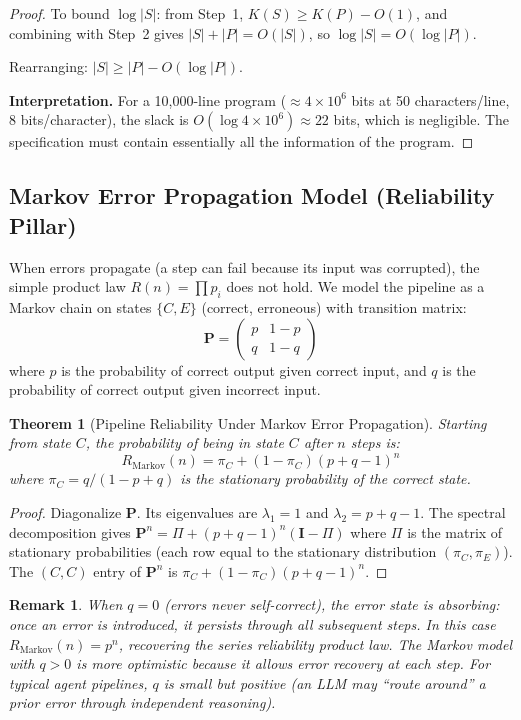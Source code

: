 \documentclass[11pt, a4paper]{googledeepmind}
\newtheorem{theorem}{Theorem}[section]
\newtheorem*{remark}{Remark}
\begin{document}
\begin{appendices}
\begin{proof}
To bound $\log |S|$: from Step~1, $K(S) \geq K(P) - O(1)$, and combining
with Step~2 gives $|S| + |P| = O(|S|)$, so $\log |S| = O(\log |P|)$.

Rearranging: $|S| \geq |P| - O(\log |P|)$.

\textbf{Interpretation.} For a 10,000-line program ($\approx 4 \times 10^6$ bits
at 50 characters/line, 8 bits/character), the slack is
$O(\log 4 \times 10^6) \approx 22$ bits, which is negligible.
The specification must contain essentially all the information of the program.
\end{proof}


\subsection{Markov Error Propagation Model (Reliability Pillar)}

When errors propagate (a step can fail because its input was corrupted),
the simple product law $R(n) = \prod p_i$ does not hold.
We model the pipeline as a Markov chain on states $\{C, E\}$ (correct, erroneous)
with transition matrix:
\[
  \mathbf{P} = \begin{pmatrix} p & 1 - p \\ q & 1 - q \end{pmatrix}
\]
where $p$ is the probability of correct output given correct input,
and $q$ is the probability of correct output given incorrect input.

\begin{theorem}[Pipeline Reliability Under Markov Error Propagation]
Starting from state $C$, the probability of being in state $C$ after $n$ steps is:
\[
  R_{\mathrm{Markov}}(n) = \pi_C + (1 - \pi_C)(p + q - 1)^n
\]
where $\pi_C = q / (1 - p + q)$ is the stationary probability of the correct state.
\end{theorem}

\begin{proof}
Diagonalize $\mathbf{P}$. Its eigenvalues are $\lambda_1 = 1$ and
$\lambda_2 = p + q - 1$. The spectral decomposition gives
$\mathbf{P}^n = \Pi + (p + q - 1)^n (\mathbf{I} - \Pi)$
where $\Pi$ is the matrix of stationary probabilities (each row equal
to the stationary distribution $(\pi_C, \pi_E)$).
The $(C, C)$ entry of $\mathbf{P}^n$ is
$\pi_C + (1 - \pi_C)(p + q - 1)^n$.
\end{proof}

\begin{remark}
When $q = 0$ (errors never self-correct), the error state is absorbing:
once an error is introduced, it persists through all subsequent steps.
In this case $R_{\mathrm{Markov}}(n) = p^n$, recovering the series reliability
product law. The Markov model with $q > 0$ is more optimistic because it
allows error recovery at each step. For typical agent pipelines, $q$ is small
but positive (an LLM may ``route around'' a prior error through independent reasoning).
\end{remark}



\end{appendices}
\end{document}
